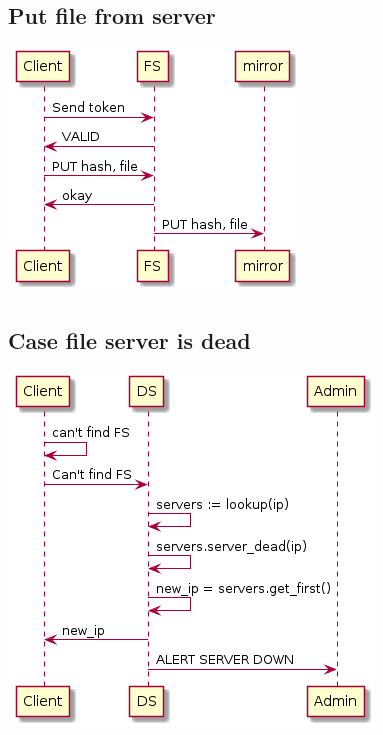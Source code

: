 \documentclass[11pt]{article}
\begin{document}
\subsection{Put file from server}
\label{sec:orgeae1245}
\begin{center}
\includegraphics[width=.9\linewidth]{put_file.png}
\end{center}

\subsection{Case file server is dead}
\label{sec:org1f4a2df}
\begin{center}
\includegraphics[width=.9\linewidth]{file_server_dies.png}
\end{center}
\end{document}
